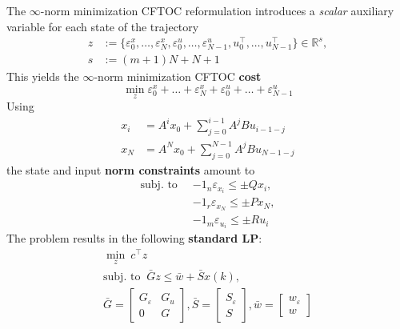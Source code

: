 \newpar{}
\label{l_inf_CFTOC}

The $\infty$-norm minimization CFTOC reformulation introduces a \textit{scalar} auxiliary variable for each state of the trajectory
\begin{align*}
    z & := \{ \varepsilon_{0}^x, \dots, \varepsilon_{N}^x, \varepsilon_{0}^u, \dots, \varepsilon_{N-1}^u, u_0^\top, \dots, u_{N-1}^\top \} \in \mathbb{R}^s, \\
    s & := (m + 1) N + N + 1
\end{align*}
This yields the $\infty$-norm minimization CFTOC \textbf{cost}
\begin{equation*}
    \min_z \varepsilon_{0}^x + \dots + \varepsilon_{N}^x + \varepsilon_{0}^u + \dots + \varepsilon_{N-1}^u
\end{equation*}
Using
\begin{align*}
    x_i & = A^i x_0 + \sum_{j=0}^{i-1} A^j B u_{i-1-j} \\
    x_N & = A^N x_0 + \sum_{j=0}^{N-1} A^j B u_{N-1-j}
\end{align*}
the state and input \textbf{norm constraints} amount to
\begin{align*}
    \text{subj.\ to } \  & -1_n \varepsilon_{x_i} \leq \pm Q x_i, \\
                         & -1_r \varepsilon_{x_N} \leq \pm P x_N, \\
                         & -1_m \varepsilon_{u_i} \leq \pm R u_i
\end{align*}
The problem results in the following \textbf{standard LP}:
\begin{gather*}
    \min_z \              c^\top z                                                                                                                                                              \\
    \text{subj.\ to } \   \bar{G} z \leq \bar{w} + \bar{S} x(k),                                                                                                                                \\
    \bar{G}               = \begin{bmatrix} G_\varepsilon & G_u \\ 0 & G\end{bmatrix}, \bar{S} = \begin{bmatrix} S_\varepsilon \\ S \end{bmatrix}, \bar{w}= \begin{bmatrix} w_\varepsilon \\ w \end{bmatrix}
\end{gather*}
